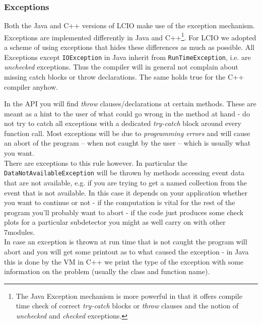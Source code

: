 \documentclass[twoside]{article}
\begin{document}


\subsubsection{Exceptions} \label{exceptions}
Both the Java and C++ versions of LCIO make use of the exception mechanism. Exceptions are 
implemented differently in Java and C++\footnote{The Java Exception mechanism is more powerful 
in that it offers compile time check of correct {\em try-catch} blocks or {\em throw} clauses 
and the notion of {\em unchecked} and {\em checked} exceptions.}. 
For LCIO we adopted a scheme of using exceptions that 
hides these differences as much as possible. All Exceptions except \verb$IOException$ in Java inherit 
from \verb$RunTimeException$, i.e. are {\em unchecked} exceptions. Thus the compiler will in general 
not complain about missing catch blocks or throw declarations. The same holds true for the C++ compiler 
anyhow.

In the API you will find {\em throw} clauses/declarations at certain methods. These are meant as a hint
to the user of what could go wrong in the method at hand - do not try to catch all exceptions with a 
dedicated {\em try-catch} block around every function call. Most exceptions will be due to 
{\em programming errors} and will cause an abort of the program -- when not caught by the user -- 
which is usually what you want.\\
There are exceptions to this rule however. In particular the \verb$DataNotAvailableException$ will be
thrown by methods accessing event data that are not available, e.g. if you are trying to get a named 
collection from the event that is not available. 
In this case it depends on your application whether you want to continue or not - if the 
computation is vital for the rest of the program you'll probably want to abort - if the code just
produces some check plots for a particular subdetector you might as well carry on with other 
7modules.\\
In case an exception is thrown at run time that is not caught the program will abort and you will get 
some printout as to what caused the exception - 
in Java this is done by the VM in C++ we print the type of the exception with some information on the 
problem (usually the class and function name).
\end{document}

